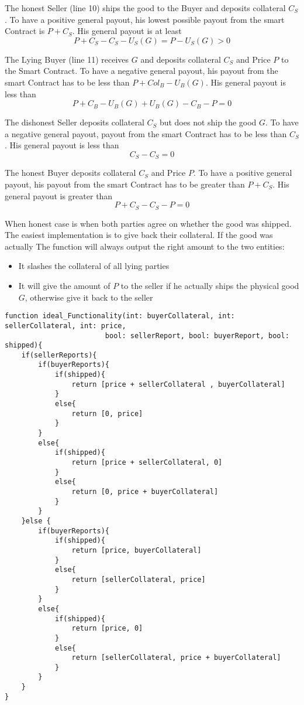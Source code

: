 \documentclass{cacthesis}
\begin{document}
The honest Seller (line 10) ships the good to the Buyer and deposits collateral $C_S$. To have a positive general payout, his lowest possible payout from the smart Contract is $P + C_S$. His general payout is at least
\[P + C_S - C_S - U_S(G) = P - U_S(G) > 0\]

The Lying Buyer (line 11) receives $G$ and deposits collateral $C_S$ and Price $P$ to the Smart Contract. To have a negative general payout, his payout from the smart Contract has to be less than $P + Col_B - U_B(G)$. His general payout is less than
\[P + C_B - U_B(G) + U_B(G) - C_B -P = 0\]

The dishonest Seller deposits collateral $C_S$ but does not ship the good $G$. To have a negative general payout, payout from the smart Contract has to be less than $C_S$. His general payout is less than
\[C_S - C_S = 0\]

The honest Buyer deposits collateral $C_S$ and Price $P$. To have a positive general payout, his payout from the smart Contract has to be greater than $P + C_S$. His general payout is greater than
\[P + C_S - C_S - P = 0\]

When honest case is when both parties agree on whether the good was shipped. The easiest implementation is to give back their collateral. If the good was actually
The function will always output the right amount to the two entities:
\begin{itemize}
    \item It slashes the collateral of all lying parties
    \item It will give the amount of $P$ to the seller if he actually ships the physical good $G$, otherwise give it back to the seller
\end{itemize}

\begin{verbatim}
function ideal_Functionality(int: buyerCollateral, int: sellerCollateral, int: price,
                        bool: sellerReport, bool: buyerReport, bool: shipped){
    if(sellerReports){
        if(buyerReports){
            if(shipped){
                return [price + sellerCollateral , buyerCollateral]
            }
            else{
                return [0, price]
            }
        }
        else{
            if(shipped){
                return [price + sellerCollateral, 0]
            }
            else{
                return [0, price + buyerCollateral]
            }
        }
    }else {
        if(buyerReports){
            if(shipped){
                return [price, buyerCollateral]
            }
            else{
                return [sellerCollateral, price]
            }
        }
        else{
            if(shipped){
                return [price, 0]
            }
            else{
                return [sellerCollateral, price + buyerCollateral]
            }
        }    
    }
}
\end{verbatim}
\end{document}
